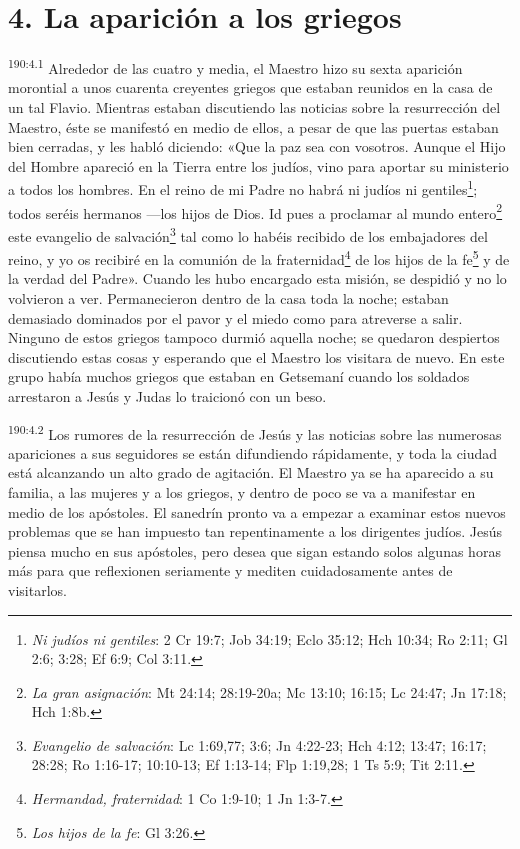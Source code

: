 \section*{4. La aparición a los griegos}
\par
\textsuperscript{190:4.1} Alrededor de las cuatro y media, el Maestro hizo su sexta aparición morontial a unos cuarenta creyentes griegos que estaban reunidos en la casa de un tal Flavio. Mientras estaban discutiendo las noticias sobre la resurrección del Maestro, éste se manifestó en medio de ellos, a pesar de que las puertas estaban bien cerradas, y les habló diciendo: «Que la paz sea con vosotros. Aunque el Hijo del Hombre apareció en la Tierra entre los judíos, vino para aportar su ministerio a todos los hombres. En el reino de mi Padre no habrá ni judíos ni gentiles\footnote{\textit{Ni judíos ni gentiles}: 2 Cr 19:7; Job 34:19; Eclo 35:12; Hch 10:34; Ro 2:11; Gl 2:6; 3:28; Ef 6:9; Col 3:11.}; todos seréis hermanos ---los hijos de Dios. Id pues a proclamar al mundo entero\footnote{\textit{La gran asignación}: Mt 24:14; 28:19-20a; Mc 13:10; 16:15; Lc 24:47; Jn 17:18; Hch 1:8b.} este evangelio de salvación\footnote{\textit{Evangelio de salvación}: Lc 1:69,77; 3:6; Jn 4:22-23; Hch 4:12; 13:47; 16:17; 28:28; Ro 1:16-17; 10:10-13; Ef 1:13-14; Flp 1:19,28; 1 Ts 5:9; Tit 2:11.} tal como lo habéis recibido de los embajadores del reino, y yo os recibiré en la comunión de la fraternidad\footnote{\textit{Hermandad, fraternidad}: 1 Co 1:9-10; 1 Jn 1:3-7.} de los hijos de la fe\footnote{\textit{Los hijos de la fe}: Gl 3:26.} y de la verdad del Padre». Cuando les hubo encargado esta misión, se despidió y no lo volvieron a ver. Permanecieron dentro de la casa toda la noche; estaban demasiado dominados por el pavor y el miedo como para atreverse a salir. Ninguno de estos griegos tampoco durmió aquella noche; se quedaron despiertos discutiendo estas cosas y esperando que el Maestro los visitara de nuevo. En este grupo había muchos griegos que estaban en Getsemaní cuando los soldados arrestaron a Jesús y Judas lo traicionó con un beso.

\par
\textsuperscript{190:4.2} Los rumores de la resurrección de Jesús y las noticias sobre las numerosas apariciones a sus seguidores se están difundiendo rápidamente, y toda la ciudad está alcanzando un alto grado de agitación. El Maestro ya se ha aparecido a su familia, a las mujeres y a los griegos, y dentro de poco se va a manifestar en medio de los apóstoles. El sanedrín pronto va a empezar a examinar estos nuevos problemas que se han impuesto tan repentinamente a los dirigentes judíos. Jesús piensa mucho en sus apóstoles, pero desea que sigan estando solos algunas horas más para que reflexionen seriamente y mediten cuidadosamente antes de visitarlos.

